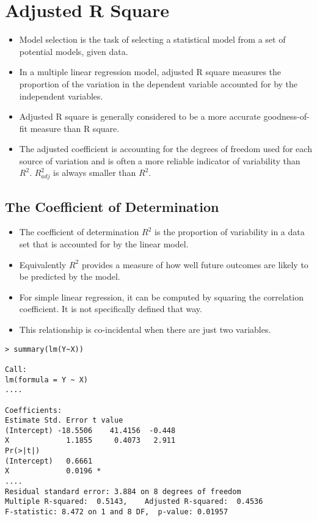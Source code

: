 \section{Adjusted R Square}

\begin{itemize}
\item Model selection is the task of selecting a statistical model from a set of potential models, given data.
\item In a multiple linear regression model, adjusted R square measures the proportion of the variation in the dependent variable 
accounted for by the independent variables.  
\item Adjusted R square is generally considered to be a more accurate goodness-of-fit measure than R square.
\item The adjusted coefficient is accounting for the degrees of freedom
used for each source of variation and is often a more reliable
indicator of variability than $R^2$. $R^2_{adj}$ is always smaller
than $R^2$.
\end{itemize}


\subsection*{The Coefficient of Determination}
\begin{itemize}
\item The coefficient of determination $R^2$ is the proportion of variability in a data set that is accounted for by the linear model. 
\item Equivalently $R^2$ provides a measure of how well future outcomes are likely to be predicted by the model.

\item For simple linear regression, it can be computed by squaring the correlation coefficient. It is not specifically defined that way. 
\item This relationship is co-incidental when there are just two variables.
\end{itemize}





{

\begin{framed}
\begin{verbatim}
> summary(lm(Y~X))

Call:
lm(formula = Y ~ X)
....

Coefficients:
Estimate Std. Error t value
(Intercept) -18.5506    41.4156  -0.448
X             1.1855     0.4073   2.911
Pr(>|t|)  
(Intercept)   0.6661  
X             0.0196 *
....
Residual standard error: 3.884 on 8 degrees of freedom
Multiple R-squared:  0.5143,    Adjusted R-squared:  0.4536 
F-statistic: 8.472 on 1 and 8 DF,  p-value: 0.01957

\end{verbatim}
\end{framed}
}

